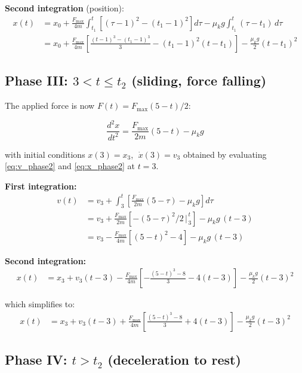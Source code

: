 \documentclass[11pt]{article}
\newcommand{\ddd}[2]{\frac{d^2 #1}{d #2^2}}
\begin{document}
\medskip
\noindent
\textbf{Second integration} (position):
\begin{align}
x(t) &= x_0 + \frac{F_{\max}}{4m}\int_{t_1}^{t}\left[(\tau-1)^2 - (t_1-1)^2\right]d\tau - \mu_k g\int_{t_1}^{t}(\tau - t_1)\,d\tau \\[6pt]
     &= x_0 + \frac{F_{\max}}{4m}\left[\frac{(t-1)^3 - (t_1-1)^3}{3} - (t_1-1)^2(t - t_1)\right] - \frac{\mu_k g}{2}(t - t_1)^2
\label{eq:x_phase2}
\end{align}

\subsection{Phase III: $3 < t \le t_2$ (sliding, force falling)}

The applied force is now $F(t) = F_{\max}(5 - t)/2$:

\begin{equation}
\boxed{\ddd{x}{t} = \frac{F_{\max}}{2m}(5 - t) - \mu_k g}
\label{eq:phase3}
\end{equation}

\noindent
with initial conditions $x(3) = x_3$, $\;\dot{x}(3) = v_3$ obtained by evaluating \eqref{eq:v_phase2} and \eqref{eq:x_phase2} at $t = 3$.

\medskip
\noindent
\textbf{First integration:}
\begin{align}
v(t) &= v_3 + \int_{3}^{t}\left[\frac{F_{\max}}{2m}(5 - \tau) - \mu_k g\right]d\tau \\[6pt]
     &= v_3 + \frac{F_{\max}}{2m}\left[-(5-\tau)^2/2\,\Big|_{\,3}^{\,t}\right] - \mu_k g\,(t - 3) \\[6pt]
     &= v_3 - \frac{F_{\max}}{4m}\left[(5-t)^2 - 4\right] - \mu_k g\,(t - 3)
\label{eq:v_phase3}
\end{align}

\medskip
\noindent
\textbf{Second integration:}
\begin{align}
x(t) &= x_3 + v_3(t - 3) - \frac{F_{\max}}{4m}\left[-\frac{(5-t)^3 - 8}{3} - 4(t-3)\right] - \frac{\mu_k g}{2}(t-3)^2
\end{align}

\noindent
which simplifies to:
\begin{align}
x(t) &= x_3 + v_3(t-3) + \frac{F_{\max}}{4m}\left[\frac{(5-t)^3 - 8}{3} + 4(t-3)\right] - \frac{\mu_k g}{2}(t-3)^2
\label{eq:x_phase3}
\end{align}

\subsection{Phase IV: $t > t_2$ (deceleration to rest)}
\end{document}
